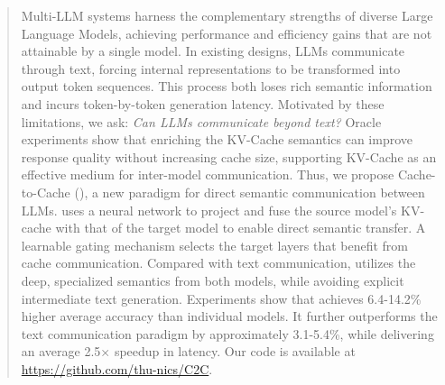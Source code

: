 \begin{abstract}
\label{sec:abstract}
Multi-LLM systems harness the complementary strengths of diverse Large Language Models, achieving performance and efficiency gains that are not attainable by a single model.
In existing designs, LLMs communicate through text, forcing internal representations to be transformed into output token sequences.
This process both loses rich semantic information and incurs token-by-token generation latency. 
Motivated by these limitations, we ask: \emph{Can LLMs communicate beyond text?} 
Oracle experiments show that enriching the KV-Cache semantics can improve response quality without increasing cache size, supporting KV-Cache as an effective medium for inter-model communication.
Thus, we propose Cache-to-Cache (\name), a new paradigm for direct semantic communication between LLMs.
\name uses a neural network to project and fuse the source model’s KV-cache with that of the target model to enable direct semantic transfer. 
A learnable gating mechanism selects the target layers that benefit from cache communication.
Compared with text communication, \name utilizes the deep, specialized semantics from both models, while avoiding explicit intermediate text generation.
Experiments show that \name achieves 6.4-14.2\% higher average accuracy than individual models. 
It further outperforms the text communication paradigm by approximately 3.1-5.4\%, while delivering an average 2.5× speedup in latency.
Our code is available at \url{https://github.com/thu-nics/C2C}.
\end{abstract}